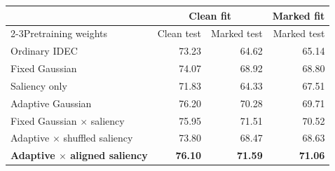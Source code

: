 \begin{tabular}{lrrr}
\toprule
& \multicolumn{2}{c}{Clean fit} & Marked fit\\
\cmidrule(lr){2-3}Pretraining weights & Clean test & Marked test & Marked test\\\midrule
Ordinary IDEC & 73.23 & 64.62 & 65.14\\
Fixed Gaussian & 74.07 & 68.92 & 68.80\\
Saliency only & 71.83 & 64.33 & 67.51\\
Adaptive Gaussian & 76.20 & 70.28 & 69.71\\
Fixed Gaussian $\times$ saliency & 75.95 & 71.51 & 70.52\\
Adaptive $\times$ shuffled saliency & 73.80 & 68.47 & 68.63\\
\midrule
\textbf{Adaptive $\times$ aligned saliency} & \textbf{76.10} & \textbf{71.59} & \textbf{71.06}\\
\bottomrule
\end{tabular}

